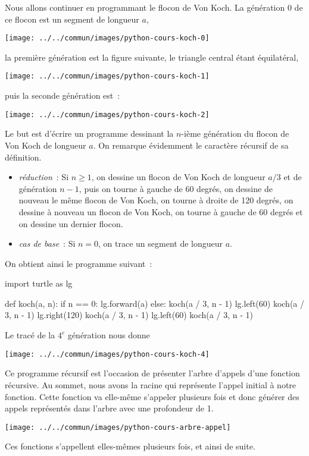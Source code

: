 \documentclass{magnolia}
\begin{document}
Nous allons continuer en programmant le flocon de Von Koch. La génération 0
de ce flocon est un segment de longueur $a$,
\begin{center}
\texttt{[image: ../../commun/images/python-cours-koch-0]}
\end{center}
la première génération est la figure suivante, le \og triangle \fg central étant
équilatéral,
\begin{center}
\texttt{[image: ../../commun/images/python-cours-koch-1]}
\end{center}
puis la seconde génération est~:
\begin{center}
\texttt{[image: ../../commun/images/python-cours-koch-2]}
\end{center}
Le but est d'écrire un programme dessinant la $n$-ième génération du flocon de
Von Koch de longueur $a$. On remarque évidemment le caractère récursif de sa
définition.
\begin{itemize}
\item \emph{réduction}~: Si $n\geq 1$, on dessine un flocon de Von Koch de longueur
  $a/3$ et de génération $n-1$, puis on tourne à gauche de 60 degrés, on
  dessine de nouveau le même flocon de Von Koch, on tourne à droite de 120 degrés,
  on dessine à nouveau un flocon de Von Koch, on tourne à gauche de 60 degrés
  et on dessine un dernier flocon.
\item \emph{cas de base}~: Si $n=0$, on trace un segment de longueur $a$.
\end{itemize}
On obtient ainsi le programme suivant~:
\begin{pythoncodeline}
import turtle as lg

def koch(a, n):
    if n == 0:
        lg.forward(a)
    else:
        koch(a / 3, n - 1)
        lg.left(60)
        koch(a / 3, n - 1)
        lg.right(120)
        koch(a / 3, n - 1)
        lg.left(60)
        koch(a / 3, n - 1)
\end{pythoncodeline}
Le tracé de la $4^e$ génération nous donne
\begin{center}
\texttt{[image: ../../commun/images/python-cours-koch-4]}
\end{center}
Ce programme récursif est l'occasion de présenter l'arbre d'appels d'une fonction
récursive. Au sommet, nous avons la racine qui représente l'appel initial à notre
fonction. Cette fonction va elle-même s'appeler plusieurs fois et donc
générer des appels représentés dans l'arbre avec une profondeur de 1.
\begin{center}
\texttt{[image: ../../commun/images/python-cours-arbre-appel]}
\end{center}
Ces fonctions s'appellent elles-mêmes plusieurs fois, et ainsi de suite.\\
\end{document}
